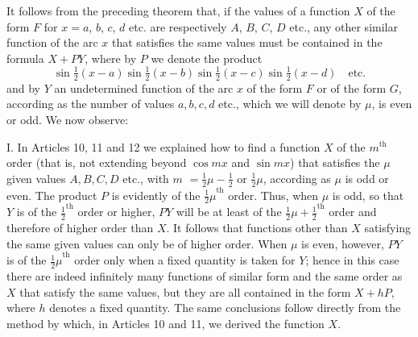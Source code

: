 \begingroup
\renewcommand{\arraystretch}{1.45}
It follows from the preceding theorem that, if the values of a function $X$ of the form $F$ for $x=a$, $b$, $c$, $d$ etc. are respectively $A$, $B$, $C$, $D$ etc., any other similar function of the arc $x$ that satisfies the same values must be contained in the formula $X+PY$, where by $P$ we denote the product
\[
\sin\tfrac12(x-a)\sin\tfrac12(x-b)\sin\tfrac12(x-c)\sin\tfrac12(x-d)\quad\text{etc.}
\]
and by $Y$ an undetermined function of the arc $x$ of the form $F$ or of the form
\(G\), according as the number of values \(a,b,c,d\) etc., which we will denote by \(\mu\), is even or odd. We now observe:

I. In Articles 10, 11 and 12 we explained how to find a function \(X\) of the \(m^{\mathrm{th}}\) order (that is, not extending beyond \(\cos mx\) and \(\sin mx\)) that satisfies the \(\mu\) given values \(A,B,C,D\) etc., with \(m\) \(=\frac{1}{2}\mu-\frac{1}{2}\) or \(\frac{1}{2}\mu\), according as \(\mu\) is odd or even. The product \(P\) is evidently of the \({\frac{1}{2}\mu}^{\mathrm{th}}\) order. Thus, when \(\mu\) is odd, so that \(Y\) is of the \({\frac{1}{2}}^{\mathrm{th}}\) order or higher, \(PY\) will be at least of the \({\frac{1}{2}\mu+\frac{1}{2}}^{\mathrm{th}}\) order and therefore of higher order than \(X\). It follows that functions other than \(X\) satisfying the same given values can only be of higher order. When \(\mu\) is even, however, \(PY\) is of the \({\frac{1}{2}\mu}^{\mathrm{th}}\) order only when a fixed quantity is taken for \(Y\); hence in this case there are indeed infinitely many functions of similar form and the same order as \(X\) that satisfy the same values, but they are all contained in the form \(X+hP\), where \(h\) denotes a fixed quantity. The same conclusions follow directly from the method by which, in Articles 10 and 11, we derived the function \(X\).

